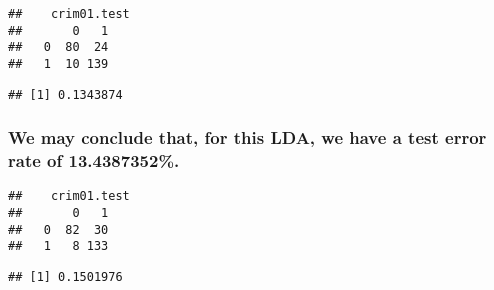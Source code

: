 \documentclass[]{article}
\newenvironment{Shaded}{\begin{snugshade}}{\end{snugshade}}
\newcommand{\KeywordTok}[1]{\textcolor[rgb]{0.13,0.29,0.53}{\textbf{#1}}}
\newcommand{\DataTypeTok}[1]{\textcolor[rgb]{0.13,0.29,0.53}{#1}}
\newcommand{\StringTok}[1]{\textcolor[rgb]{0.31,0.60,0.02}{#1}}
\newcommand{\OperatorTok}[1]{\textcolor[rgb]{0.81,0.36,0.00}{\textbf{#1}}}
\newcommand{\NormalTok}[1]{#1}
\begin{document}
\begin{verbatim}
##    crim01.test
##       0   1
##   0  80  24
##   1  10 139
\end{verbatim}

\begin{Shaded}
\end{Shaded}

\begin{verbatim}
## [1] 0.1343874
\end{verbatim}

\subsubsection{We may conclude that, for this LDA, we have a test error
rate of
13.4387352\%.}\label{we-may-conclude-that-for-this-lda-we-have-a-test-error-rate-of-13.4387352.}

\begin{Shaded}
\end{Shaded}

\begin{verbatim}
##    crim01.test
##       0   1
##   0  82  30
##   1   8 133
\end{verbatim}

\begin{Shaded}
\end{Shaded}

\begin{verbatim}
## [1] 0.1501976
\end{verbatim}
\end{document}
